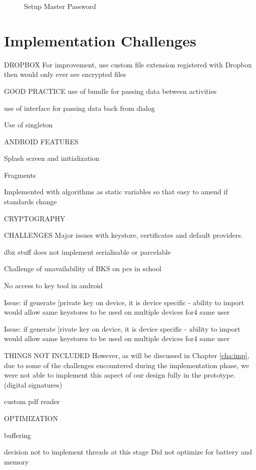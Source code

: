 \begin{figure}[h!]
                                                                                                     
    \caption{Setup Master Password }
    \label{fig:alert}
\end{figure}
\section{Implementation Challenges}



DROPBOX
For improvement, use custom file extension registered with Dropbox then would only ever see encrypted files

GOOD PRACTICE
use of bundle for passing data between activities

use of interface for passing data back from dialog

Use of singleton



ANDROID FEATURES

Splash screen and initialization

Fragments

Implemented with algorithms as static variables so that easy to amend if standards change

CRYPTOGRAPHY




CHALLENGES
Major issues with keystore, certificates and default providers.

dbx stuff does not implement serialisable or parcelable


Challenge of unavailability of BKS on pcs in school

No access to key tool in android

Issue: if generate [private key on device, it is device specific - ability to import would allow same keystores to be used on multiple devices for4 same user


Issue: if generate [rivate key on device, it is device specific - ability to import would allow same keystores to be used on multiple devices for4 same user

THINGS NOT INCLUDED
However, as will be discussed in Chapter \ref{cha:imp}, due to some of the challenges encountered during the implementation phase, we were not able to implement this aspect of our design fully in the prototype. (digital signatures)

custom pdf reader

OPTIMIZATION

buffering

decision not to implement threads at this stage
Did not optimize for battery and memory



